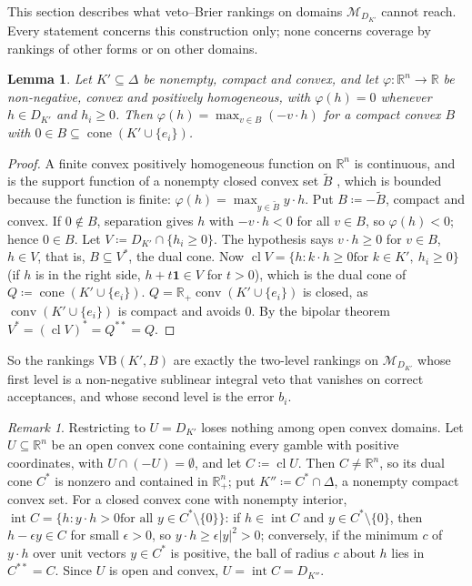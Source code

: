 \documentclass[11pt]{article}
\newcommand{\R}{\mathbb{R}}
\newcommand{\one}{\mathbf{1}}
\newcommand{\M}{\mathcal{M}}
\newcommand{\VB}{\mathrm{VB}}
\DeclareMathOperator{\conv}{conv}
\DeclareMathOperator{\cone}{cone}
\DeclareMathOperator{\cl}{cl}
\DeclareMathOperator{\inter}{int}
\theoremstyle{plain}
\newtheorem{lemma}[theorem]{Lemma}
\theoremstyle{definition}
\theoremstyle{remark}
\newtheorem{remark}[theorem]{Remark}
\begin{document}
This section describes what veto--Brier rankings on domains $\M_{D_{K'}}$ cannot reach.
Every statement concerns this construction only; none concerns coverage by rankings of
other forms or on other domains.

\begin{lemma}\label{lem:sublinear}
Let $K'\subseteq\Delta$ be nonempty, compact and convex, and let $\varphi:\R^n\to\R$ be
non-negative, convex and positively homogeneous, with $\varphi(h)=0$ whenever $h\in
D_{K'}$ and $h_i\ge0$. Then $\varphi(h)=\max_{v\in B}(-v\cdot h)$ for a compact convex $B$
with $0\in B\subseteq\cone(K'\cup\{e_i\})$.
\end{lemma}

\begin{proof}
A finite convex positively homogeneous function on $\R^n$ is continuous, and is the
support function of a nonempty closed convex set $\tilde B$ \cite[Thm.~13.2]{Rockafellar},
which is bounded because the function is finite: $\varphi(h)=\max_{y\in\tilde B}y\cdot h$.
Put $B\coloneqq-\tilde B$, compact and convex. If $0\notin B$, separation
gives $h$ with $-v\cdot h<0$ for all $v\in B$, so $\varphi(h)<0$; hence $0\in B$. Let
$V\coloneqq D_{K'}\cap\{h_i\ge0\}$. The hypothesis says $v\cdot h\ge0$ for $v\in B$,
$h\in V$, that is, $B\subseteq V^\ast$, the dual cone. Now $\cl V=\{h:k\cdot h\ge0\text{
for }k\in K',\ h_i\ge0\}$ (if $h$ is in the right side, $h+t\one\in V$ for $t>0$), which is
the dual cone of $Q\coloneqq\cone(K'\cup\{e_i\})$. $Q=\R_+\conv(K'\cup\{e_i\})$ is closed,
as $\conv(K'\cup\{e_i\})$ is compact and avoids $0$. By the bipolar theorem
$V^\ast=(\cl V)^\ast=Q^{\ast\ast}=Q$.
\end{proof}

So the rankings $\VB(K',B)$ are exactly the two-level rankings on $\M_{D_{K'}}$ whose
first level is a non-negative sublinear integral veto that vanishes on correct
acceptances, and whose second level is the error $b_i$.

\begin{remark}\label{rem:convexU}
Restricting to $U=D_{K'}$ loses nothing among open convex domains. Let $U\subseteq\R^n$ be
an open convex cone containing every gamble with positive coordinates, with $U\cap(-U)=
\emptyset$, and let $C\coloneqq\cl U$. Then $C\neq\R^n$, so its dual cone $C^\ast$ is
nonzero and contained in $\R^n_+$; put $K''\coloneqq C^\ast\cap\Delta$, a nonempty compact
convex set. For a closed convex cone with nonempty interior, $\inter C=\{h:y\cdot h>0\text{
for all }y\in C^\ast\setminus\{0\}\}$: if $h\in\inter C$ and $y\in C^\ast\setminus\{0\}$,
then $h-\epsilon y\in C$ for small $\epsilon>0$, so $y\cdot h\ge\epsilon|y|^2>0$;
conversely, if the minimum $c$ of $y\cdot h$ over unit vectors $y\in C^\ast$ is positive,
the ball of radius $c$ about $h$ lies in $C^{\ast\ast}=C$. Since $U$ is open and convex,
$U=\inter C=D_{K''}$.
\end{remark}
\end{document}
